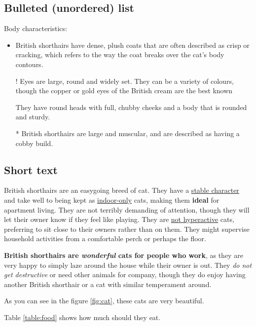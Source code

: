 \subsection{Bulleted (unordered) list}
    Body characteristics:
    \begin{itemize}
         \item British shorthairs have dense, plush coats that are often described as crisp or cracking, which refers to the way the coat breaks over the cat's body contours.
         \item[!] Eyes are large, round and widely set. They can be a variety of colours, though the copper or gold eyes of the British cream are the best known
        \item[ ] They have round heads with full, chubby cheeks and a body that is rounded and sturdy.
        \item [*] British shorthairs are large and muscular, and are described as having a cobby build.
    \end{itemize}
    
\subsection{Short text}
    British shorthairs are an easygoing breed of cat. They have a \underline{stable character} and take well to being kept as \underline{indoor-only} cats, making them \textbf{ideal} for apartment living. They are not terribly demanding of attention, though they will let their owner know if they feel like playing. They are \underline{not hyperactive} cats, preferring to sit close to their owners rather than on them. They might supervise household activities from a comfortable perch or perhaps the floor. \par
    \textbf{British shorthairs are \emph{wonderful} cats for people who work}, as they are very happy to simply laze around the house while their owner is out. They \emph{do not get destructive} or need other animals for company, though they do enjoy having another British shorthair or a cat with similar temperament around. \par
    As you can see in the figure \ref{fig:cat}, these cats are very beautiful. \par
    Table \ref{table:food} shows how much should they eat.
